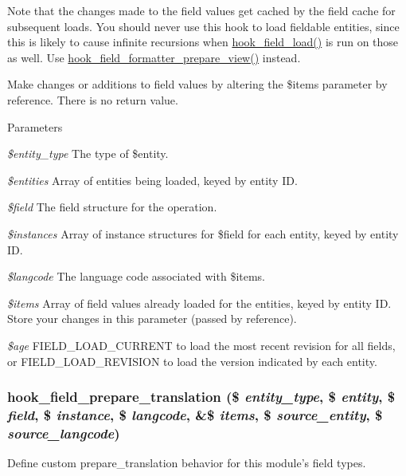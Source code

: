 Note that the changes made to the field values get cached by the field cache for subsequent loads. You should never use this hook to load fieldable entities, since this is likely to cause infinite recursions when \hyperlink{group__field__types_ga37f2456e9b5b8b39dc11cffd59163c19}{hook\_\-field\_\-load()} is run on those as well. Use \hyperlink{group__field__formatter_ga2c1856869caa776fd9e5db4af4e0b57b}{hook\_\-field\_\-formatter\_\-prepare\_\-view()} instead.

Make changes or additions to field values by altering the \$items parameter by reference. There is no return value.


\begin{DoxyParams}{Parameters}
\item[{\em \$entity\_\-type}]The type of \$entity. \item[{\em \$entities}]Array of entities being loaded, keyed by entity ID. \item[{\em \$field}]The field structure for the operation. \item[{\em \$instances}]Array of instance structures for \$field for each entity, keyed by entity ID. \item[{\em \$langcode}]The language code associated with \$items. \item[{\em \$items}]Array of field values already loaded for the entities, keyed by entity ID. Store your changes in this parameter (passed by reference). \item[{\em \$age}]FIELD\_\-LOAD\_\-CURRENT to load the most recent revision for all fields, or FIELD\_\-LOAD\_\-REVISION to load the version indicated by each entity. \end{DoxyParams}
\hypertarget{group__field__types_ga551145e42b305ccf93e325fc590fa379}{
\subsubsection[{hook\_\-field\_\-prepare\_\-translation}]{\setlength{\rightskip}{0pt plus 5cm}hook\_\-field\_\-prepare\_\-translation (\$ {\em entity\_\-type}, \/  \$ {\em entity}, \/  \$ {\em field}, \/  \$ {\em instance}, \/  \$ {\em langcode}, \/  \&\$ {\em items}, \/  \$ {\em source\_\-entity}, \/  \$ {\em source\_\-langcode})}}
\label{group__field__types_ga551145e42b305ccf93e325fc590fa379}
Define custom prepare\_\-translation behavior for this module's field types.


